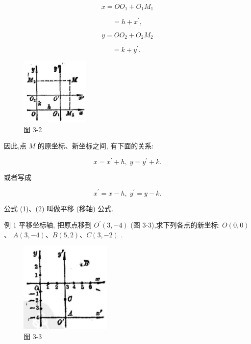 \documentclass[lang=cn,newtx,10pt,scheme=chinese]{elegantbook}
\begin{document}
\[
  x = O{O}_{1} + {O}_{1}{M}_{1}
\]

\[
  = h + {x}^{\prime },
\]

\[
  y = O{O}_{2} + {O}_{2}{M}_{2}
\]

\[
  = k + {y}^{\prime }\text{. }
\]

\begin{figure}[h]
  \centering
  \includegraphics[max width=0.3\textwidth]{images/01912cc2-ffb6-728e-9ae7-b113ff05c64b_134_803889.jpg}
  \caption{图 3-2}
\end{figure}



因此,点 \(M\) 的原坐标、新坐标之间, 有下面的关系:

\[
  x = {x}^{\prime } + h,\;y = {y}^{\prime } + k. \tag{1}
\]

或者写成

\[
    {x}^{\prime } = x - h,\;{y}^{\prime } = y - k. \tag{2}
\]

公式 (1)、(2) 叫做平移 (移轴) 公式.

例 1 平移坐标轴, 把原点移到 \({O}^{\prime }\left( {3, - 4}\right)\) (图 3-3),求下列各点的新坐标: \(O\left( {0,0}\right)\) 、 \(A\left( {3, - 4}\right) \text{、}B\left( {5,2}\right) \text{、}C\left( {3, - 2}\right)\) .

\begin{figure}[h]
  \centering
  \includegraphics[max width=0.4\textwidth]{images/01912cc2-ffb6-728e-9ae7-b113ff05c64b_134_527625.jpg}
  \caption{图 3-3}
\end{figure}
\end{document}

